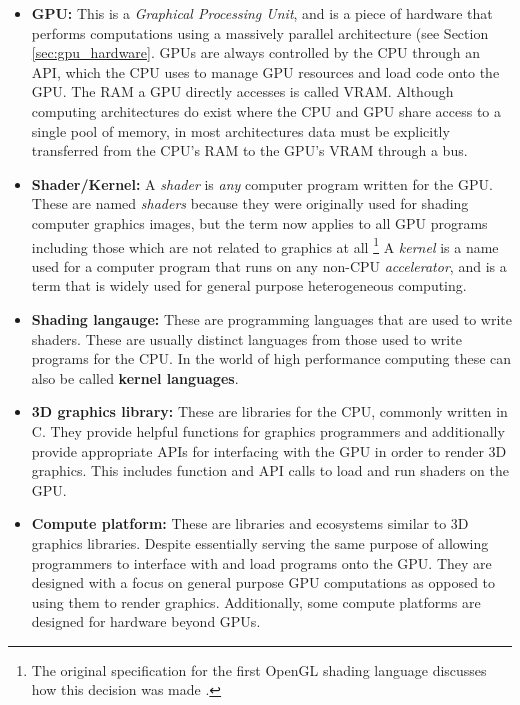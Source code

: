 \documentclass[a4paper,12pt,twoside,openright]{report}
\begin{document}
\begin{itemize}

    \item \textbf{GPU:} This is a \textit{Graphical Processing Unit}, and is a
    piece of hardware that performs computations using a massively parallel
    architecture (see Section \ref{sec:gpu_hardware}. GPUs are always
    controlled by the CPU through an API, which the CPU uses to manage GPU
    resources and load code onto the GPU. The RAM a GPU directly accesses is
    called VRAM. Although computing architectures do exist where the CPU and
    GPU share access to a single pool of memory, in most architectures data
    must be explicitly transferred from the CPU's RAM to the GPU's VRAM through
    a bus.

    \item \textbf{Shader/Kernel:} A \textit{shader} is \textit{any} computer
    program written for the GPU. These are named \textit{shaders} because they
    were originally used for shading computer graphics images, but the term now
    applies to all GPU programs including those which are not related to
    graphics at all \footnote{The original specification for the first OpenGL
    shading language discusses how this decision was made \cite{GLSL_1_10}.} A
    \textit{kernel} is a name used for a computer program that runs on any
    non-CPU \textit{accelerator}, and is a term that is widely used for general
    purpose heterogeneous computing.

    \item \textbf{Shading langauge:} These are programming languages that are
    used to write shaders. These are usually distinct languages from those used
    to write programs for the CPU. In the world of high performance computing
    these can also be called \textbf{kernel languages}.

    \item \textbf{3D graphics library:} These are libraries for the CPU,
    commonly written in C. They provide helpful functions for graphics
    programmers and additionally provide appropriate APIs for interfacing with
    the GPU in order to render 3D graphics. This includes function and API
    calls to load and run shaders on the GPU.

    \item \textbf{Compute platform:} These are libraries and ecosystems similar
    to 3D graphics libraries. Despite essentially serving the same purpose of
    allowing programmers to interface with and load programs onto the GPU. They
    are designed with a focus on general purpose GPU computations as opposed to
    using them to render graphics. Additionally, some compute platforms are
    designed for hardware beyond GPUs.


\end{itemize}
\end{document}
